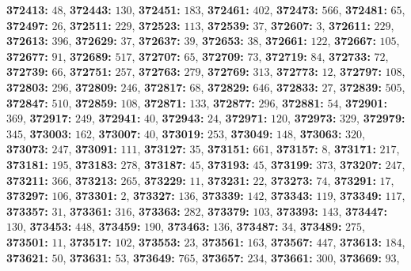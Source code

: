 \textsf{\bfseries 372413:} $48$, \textsf{\bfseries 372443:} $130$, \textsf{\bfseries 372451:} $183$, \textsf{\bfseries 372461:} $402$, \textsf{\bfseries 372473:} $566$, \textsf{\bfseries 372481:} $65$, \textsf{\bfseries 372497:} $26$, \textsf{\bfseries 372511:} $229$, \textsf{\bfseries 372523:} $113$, \textsf{\bfseries 372539:} $37$, \textsf{\bfseries 372607:} $3$, \textsf{\bfseries 372611:} $229$, \textsf{\bfseries 372613:} $396$, \textsf{\bfseries 372629:} $37$, \textsf{\bfseries 372637:} $39$, \textsf{\bfseries 372653:} $38$, \textsf{\bfseries 372661:} $122$, \textsf{\bfseries 372667:} $105$, \textsf{\bfseries 372677:} $91$, \textsf{\bfseries 372689:} $517$, \textsf{\bfseries 372707:} $65$, \textsf{\bfseries 372709:} $73$, \textsf{\bfseries 372719:} $84$, \textsf{\bfseries 372733:} $72$, \textsf{\bfseries 372739:} $66$, \textsf{\bfseries 372751:} $257$, \textsf{\bfseries 372763:} $279$, \textsf{\bfseries 372769:} $313$, \textsf{\bfseries 372773:} $12$, \textsf{\bfseries 372797:} $108$, \textsf{\bfseries 372803:} $296$, \textsf{\bfseries 372809:} $246$, \textsf{\bfseries 372817:} $68$, \textsf{\bfseries 372829:} $646$, \textsf{\bfseries 372833:} $27$, \textsf{\bfseries 372839:} $505$, \textsf{\bfseries 372847:} $510$, \textsf{\bfseries 372859:} $108$, \textsf{\bfseries 372871:} $133$, \textsf{\bfseries 372877:} $296$, \textsf{\bfseries 372881:} $54$, \textsf{\bfseries 372901:} $369$, \textsf{\bfseries 372917:} $249$, \textsf{\bfseries 372941:} $40$, \textsf{\bfseries 372943:} $24$, \textsf{\bfseries 372971:} $120$, \textsf{\bfseries 372973:} $329$, \textsf{\bfseries 372979:} $345$, \textsf{\bfseries 373003:} $162$, \textsf{\bfseries 373007:} $40$, \textsf{\bfseries 373019:} $253$, \textsf{\bfseries 373049:} $148$, \textsf{\bfseries 373063:} $320$, \textsf{\bfseries 373073:} $247$, \textsf{\bfseries 373091:} $111$, \textsf{\bfseries 373127:} $35$, \textsf{\bfseries 373151:} $661$, \textsf{\bfseries 373157:} $8$, \textsf{\bfseries 373171:} $217$, \textsf{\bfseries 373181:} $195$, \textsf{\bfseries 373183:} $278$, \textsf{\bfseries 373187:} $45$, \textsf{\bfseries 373193:} $45$, \textsf{\bfseries 373199:} $373$, \textsf{\bfseries 373207:} $247$, \textsf{\bfseries 373211:} $366$, \textsf{\bfseries 373213:} $265$, \textsf{\bfseries 373229:} $11$, \textsf{\bfseries 373231:} $22$, \textsf{\bfseries 373273:} $74$, \textsf{\bfseries 373291:} $17$, \textsf{\bfseries 373297:} $106$, \textsf{\bfseries 373301:} $2$, \textsf{\bfseries 373327:} $136$, \textsf{\bfseries 373339:} $142$, \textsf{\bfseries 373343:} $119$, \textsf{\bfseries 373349:} $117$, \textsf{\bfseries 373357:} $31$, \textsf{\bfseries 373361:} $316$, \textsf{\bfseries 373363:} $282$, \textsf{\bfseries 373379:} $103$, \textsf{\bfseries 373393:} $143$, \textsf{\bfseries 373447:} $130$, \textsf{\bfseries 373453:} $448$, \textsf{\bfseries 373459:} $190$, \textsf{\bfseries 373463:} $136$, \textsf{\bfseries 373487:} $34$, \textsf{\bfseries 373489:} $275$, \textsf{\bfseries 373501:} $11$, \textsf{\bfseries 373517:} $102$, \textsf{\bfseries 373553:} $23$, \textsf{\bfseries 373561:} $163$, \textsf{\bfseries 373567:} $447$, \textsf{\bfseries 373613:} $184$, \textsf{\bfseries 373621:} $50$, \textsf{\bfseries 373631:} $53$, \textsf{\bfseries 373649:} $765$, \textsf{\bfseries 373657:} $234$, \textsf{\bfseries 373661:} $300$, \textsf{\bfseries 373669:} $93$, 
